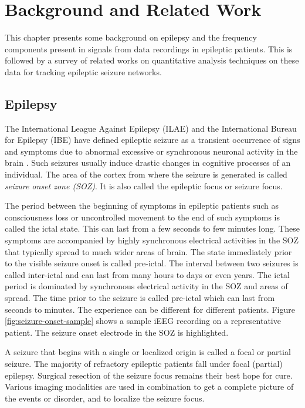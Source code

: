 
\chapter{Background and Related Work}
\label{chapter:overview}
This chapter presents some background on epilepsy and the frequency components present in signals from data recordings in epileptic patients. This is followed by a survey of related works on quantitative analysis techniques on these data for tracking epileptic seizure networks. 

\section{Epilepsy}
The International League Against Epilepsy (ILAE) and the International Bureau for Epilepsy (IBE) have defined epileptic seizure as a transient occurrence of signs and symptoms due to abnormal excessive or synchronous neuronal activity in the brain \citep{fisher2005epileptic}. Such seizures usually induce drastic changes in cognitive processes of an individual. 
The area of the cortex from where the seizure is generated is called \textit{seizure onset zone (SOZ)}. It is also called the epileptic focus or seizure focus. 

The period between the beginning of symptoms in epileptic patients such as consciousness loss or uncontrolled movement to the end of such symptoms is called the ictal state. This can last from a few seconds to few minutes long. These symptoms are accompanied by highly synchronous electrical activities in the SOZ that typically spread to much wider areas of brain. The state immediately prior to the visible seizure onset is called pre-ictal. The interval between two seizures is called inter-ictal and can last from many hours to days or even years. The ictal period is dominated by synchronous electrical activity in the SOZ and areas of spread. The time prior to the seizure is called pre-ictal which can last from seconds to minutes. The experience can be different for different patients. Figure \ref{fig:seizure-onset-sample} shows a sample iEEG recording on a representative patient. The seizure onset electrode in the SOZ is highlighted.

A seizure that begins with a single or localized origin is called a focal or partial seizure. The majority of refractory epileptic patients fall under focal (partial) epilepsy. Surgical resection of the seizure focus remains their best hope for cure. Various imaging modalities are used in combination to get a complete picture of the events or disorder, and to localize the seizure focus.  

